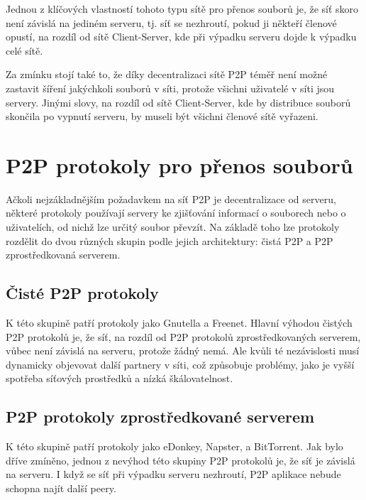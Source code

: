 \documentclass[10pt,twoside,czech,a4paper]{article}
\begin{document}
Jednou z klíčových vlastností tohoto typu sítě pro přenos souborů je, že síť skoro není závislá na jediném serveru, tj. síť se nezhroutí, pokud ji někteří členové opustí, na rozdíl od sítě Client-Server, kde při výpadku serveru dojde k výpadku celé sítě.

Za zmínku stojí také to, že díky decentralizaci sítě P2P téměř není možné zastavit šíření jakýchkoli souborů v síti, protože všichni uživatelé v síti jsou servery.
Jinými slovy, na rozdíl od sítě Client-Server, kde by distribuce souborů skončila po vypnutí serveru, by museli být všichni členové sítě vyřazeni.


\section{P2P protokoly pro přenos souborů}

Ačkoli nejzákladnějším požadavkem na síť P2P je decentralizace od serveru, některé protokoly používají servery ke zjišťování informací o souborech nebo o uživatelích, od nichž lze určitý soubor převzít.
Na základě toho lze protokoly rozdělit do dvou různých skupin podle jejich architektury: čistá P2P a P2P zprostředkovaná serverem\cite{Lui2002}.

\subsection{Čisté P2P protokoly}

K této skupině patří protokoly jako Gnutella a Freenet.
Hlavní výhodou čistých P2P protokolů je, že síť, na rozdíl od P2P protokolů zprostředkovaných serverem, vůbec není závislá na serveru, protože žádný nemá.
Ale kvůli té nezávislosti musí dynamicky objevovat další partnery v síti, což způsobuje problémy, jako je vyšší spotřeba síťových prostředků a nízká škálovatelnost\cite{Lui2002}.

	

\subsection{P2P protokoly zprostředkované serverem}

K této skupině patří protokoly jako eDonkey, Napster, a BitTorrent.
Jak bylo dříve zmíněno, jednou z nevýhod této skupiny P2P protokolů je, že síť je závislá na serveru.
I když se síť při výpadku serveru nezhroutí, P2P aplikace nebude schopna najít další peery\cite{Lui2002}.
\end{document}
